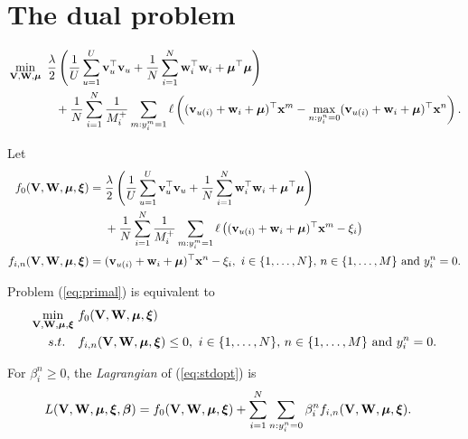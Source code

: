 \section{The dual problem}

\begin{equation}
\label{eq:primal}
\begin{aligned}
&\min_{\mathbf{V}, \mathbf{W}, \bm{\mu}} \ \frac{\lambda}{2} \left( \frac{1}{U} \sum_{u=1}^U \mathbf{v}_u^\top \mathbf{v}_u 
     + \frac{1}{N} \sum_{i=1}^N \mathbf{w}_i^\top \mathbf{w}_i + \bm{\mu}^\top \bm{\mu} \right) \\
& \hspace{4em}
     + \frac{1}{N} \sum_{i=1}^N \frac{1}{M_i^+} \sum_{m: y_i^m = 1} \ell \left( (\mathbf{v}_{u(i)} + \mathbf{w}_i + \bm{\mu})^\top \mathbf{x}^m 
     - \max_{n: y_i^n = 0} (\mathbf{v}_{u(i)} + \mathbf{w}_i + \bm{\mu})^\top \mathbf{x}^n \right).
\end{aligned}
\end{equation}

Let 
\begin{equation*}
\begin{aligned}
f_0(\V, \W, \mubm, \xibm) &= \frac{\lambda}{2} \left( \frac{1}{U} \sum_{u=1}^U \bv_u^\top \bv_u 
     + \frac{1}{N} \sum_{i=1}^N \w_i^\top \w_i + \mubm^\top \mubm \right) \\
& \quad \ 
     + \frac{1}{N} \sum_{i=1}^N \frac{1}{M_i^+} \sum_{m: y_i^m = 1} 
       \ell \left( (\bv_{u(i)} + \w_i + \mubm)^\top \x^m - \xi_i \right) \\
f_{i,n} (\V, \W, \mubm, \xibm) &= (\bv_{u(i)} + \w_i + \mubm)^\top \x^n - \xi_i, \
i \in \{1,\dots,N\}, \, n \in \{1,\dots,M\} \ \mathrm{and} \ y_i^n = 0.
\end{aligned}
\end{equation*}

Problem (\ref{eq:primal}) is equivalent to 
\begin{equation}
\label{eq:stdopt}
\begin{aligned}
\min_{\mathbf{V}, \mathbf{W}, \bm{\mu}, \bm{\xi}} \ & f_0(\mathbf{V}, \mathbf{W}, \bm{\mu}, \bm{\xi}) \\
s.t. \quad & f_{i,n}(\mathbf{V}, \mathbf{W}, \bm{\mu}, \bm{\xi}) \le 0, \
i \in \{1,\dots,N\}, \, n \in \{1,\dots,M\} \ \mathrm{and} \ y_i^n = 0.
\end{aligned}
\end{equation}

For $\beta_i^n \ge 0$, the \emph{Lagrangian} of (\ref{eq:stdopt}) is
\begin{equation*}
\begin{aligned}
L(\mathbf{V}, \mathbf{W}, \bm{\mu}, \bm{\xi}, {\bm{\beta}}) 
&= f_0(\mathbf{V}, \mathbf{W}, \bm{\mu}, \bm{\xi}) + \sum_{i=1}^N \sum_{n: y_i^n = 0} \beta_i^n f_{i,n} (\mathbf{V}, \mathbf{W}, \bm{\mu}, \bm{\xi}).
\end{aligned}
\end{equation*}

